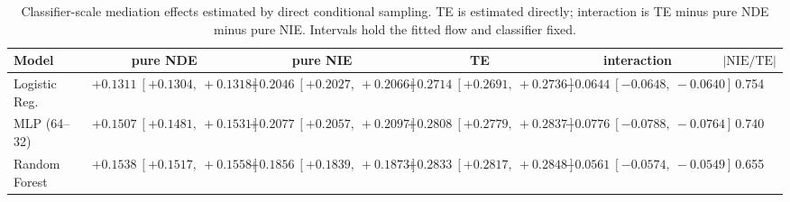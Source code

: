 \begin{table}[htbp]
  \centering
  \caption{Classifier-scale mediation effects estimated by direct conditional sampling. TE is estimated directly; interaction is TE minus pure NDE minus pure NIE. Intervals hold the fitted flow and classifier fixed.}
  \label{tab:bar_gap_overall}
  \begin{tabular}{lccccc}
    \toprule
    Model & pure NDE & pure NIE & TE & interaction & $|\mathrm{NIE}/\mathrm{TE}|$ \\
    \midrule
    Logistic Reg. & $+0.1311\ [+0.1304,\ +0.1318]$ & $+0.2046\ [+0.2027,\ +0.2066]$ & $+0.2714\ [+0.2691,\ +0.2736]$ & $-0.0644\ [-0.0648,\ -0.0640]$ & 0.754 \\
    MLP (64--32) & $+0.1507\ [+0.1481,\ +0.1531]$ & $+0.2077\ [+0.2057,\ +0.2097]$ & $+0.2808\ [+0.2779,\ +0.2837]$ & $-0.0776\ [-0.0788,\ -0.0764]$ & 0.740 \\
    Random Forest & $+0.1538\ [+0.1517,\ +0.1558]$ & $+0.1856\ [+0.1839,\ +0.1873]$ & $+0.2833\ [+0.2817,\ +0.2848]$ & $-0.0561\ [-0.0574,\ -0.0549]$ & 0.655 \\
    \bottomrule
  \end{tabular}
\end{table}